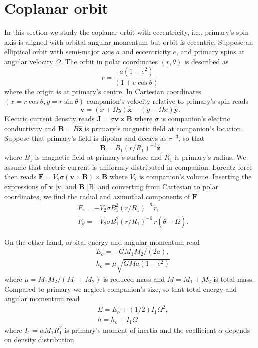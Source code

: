 \documentclass[twocolumn,linenumbers]{aastex631}
\begin{document}
\section{Coplanar orbit} \label{coplanar}

In this section we study the coplanar orbit with eccentricity, i.e., primary's spin axis is aligned with orbital angular momentum but orbit is eccentric. Suppose an elliptical orbit with semi-major axis $a$ and eccentricity $e$, and primary spins at angular velocity $\Omega$. The orbit in polar coordinates $(r,\theta)$ is described as
\begin{equation}\label{orbit}
r=\frac{a(1-e^2)}{(1+e\cos\theta)}
\end{equation}
where the origin is at primary's centre. In Cartesian coordinates $(x=r\cos\theta,y=r\sin\theta)$ companion's velocity relative to primary's spin reads
\begin{equation}\label{v}
\bm v=(\dot x+\Omega y)\hat{\bm x}+(\dot y-\Omega x)\hat{\bm y}.
\end{equation}
Electric current density reads $\bm J=\sigma\bm v\times\bm B$ where $\sigma$ is companion's electric conductivity and $\bm B=B\hat{\bm z}$ is primary's magnetic field at companion's location. Suppose that primary's field is dipolar and decays as $r^{-3}$, so that 
\begin{equation}\label{B}
\bm B=B_1(r/R_1)^{-3}
\hat{\bm z}
\end{equation}
where $B_1$ is magnetic field at primary's surface and $R_1$ is primary's radius. We assume that electric current is uniformly distributed in companion. Lorentz force then reads $\bm F=V_2\sigma(\bm v\times\bm B)\times\bm B$ where $V_2$ is companion's volume. Inserting the expressions of $\bm v$ \eqref{v} and $\bm B$ \eqref{B} and converting from Cartesian to polar coordinates, we find the radial and azimuthal components of $\bm F$
\begin{align}
& F_r=-V_2\sigma B_1^2(r/R_1)^{-6}\,\dot r, \label{force1} \\
& F_\theta=-V_2\sigma B_1^2(r/R_1)^{-6}\,r(\dot\theta-\Omega). \label{force2}
\end{align}

On the other hand, orbital energy and angular momentum read
\begin{align}
& E_o=-GM_1M_2/(2a), \label{Eo} \\
& h_o=\mu\sqrt{GMa(1-e^2)} \label{ho}
\end{align}
where $\mu=M_1M_2/(M_1+M_2)$ is reduced mass and $M=M_1+M_2$ is total mass. Compared to primary we neglect companion's size, so that total energy and angular momentum read
\begin{align}
& E=E_o+(1/2)I_1\Omega^2, \label{E} \\
& h=h_o+I_1\Omega \label{h}
\end{align}
where $I_1=\alpha M_1R_1^2$ is primary's moment of inertia and the coefficient $\alpha$ depends on density distribution.
\end{document}
